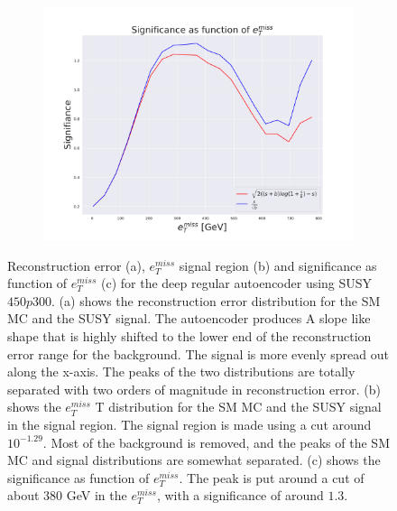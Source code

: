 \begin{figure}[H]
    \hfill  
    \begin{subfigure}{.40\textwidth}
        \includegraphics[width=\textwidth]{Figures/AE_testing/small/2lep/significance_etmiss_450p0p0300_-1.287562990021105.pdf}
        \caption{}
        \label{fig:AE_2lep_small_signi_450_2}
    \end{subfigure}
    \hfill      
    \caption[2lep shallow network | $450p300$ | AE | 2]{Reconstruction error (a), $e_T^{miss}$ signal region (b) and significance as function of 
    $e_T^{miss}$ (c) for the deep regular autoencoder using SUSY $450p300$. 
    (a) shows the reconstruction error distribution for the SM MC and the SUSY signal. 
    The autoencoder produces A slope like shape that is highly shifted to the lower end of the reconstruction error range
for the background. The signal is more evenly spread out along the x-axis. The peaks of the two distributions are totally separated
with two orders of magnitude in reconstruction error. (b) shows the $e_T^{miss}$
T distribution for the SM MC and the SUSY signal in the signal region. The signal region is made using a cut around
$10^{-1.29}$. Most of the background is removed, and the peaks of the SM MC and signal distributions are
somewhat separated. (c) shows the significance as function of $e_T^{miss}$. The peak is put 
around a cut of about 380 GeV in the $e_T^{miss}$, with a significance of around $1.3$.}
    \label{fig:AE_2lep_small_rec_sig_signi_450_2}
\end{figure}



